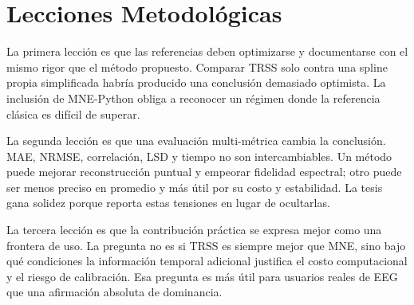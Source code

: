 \section{Lecciones Metodológicas}

La primera lección es que las referencias deben optimizarse y documentarse con el mismo rigor que el método propuesto. Comparar TRSS solo contra una spline propia simplificada habría producido una conclusión demasiado optimista. La inclusión de MNE-Python obliga a reconocer un régimen donde la referencia clásica es difícil de superar.

La segunda lección es que una evaluación multi-métrica cambia la conclusión. MAE, NRMSE, correlación, LSD y tiempo no son intercambiables. Un método puede mejorar reconstrucción puntual y empeorar fidelidad espectral; otro puede ser menos preciso en promedio y más útil por su costo y estabilidad. La tesis gana solidez porque reporta estas tensiones en lugar de ocultarlas.

La tercera lección es que la contribución práctica se expresa mejor como una frontera de uso. La pregunta no es si TRSS es siempre mejor que MNE, sino bajo qué condiciones la información temporal adicional justifica el costo computacional y el riesgo de calibración. Esa pregunta es más útil para usuarios reales de EEG que una afirmación absoluta de dominancia.
